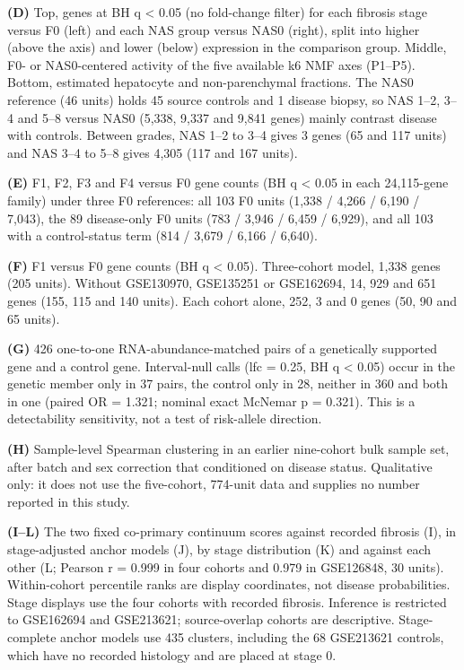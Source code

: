 \textbf{(D)} Top, genes at BH q \textless{} 0.05 (no fold-change filter) for each fibrosis stage versus F0 (left) and each NAS group versus NAS0 (right), split into higher (above the axis) and lower (below) expression in the comparison group. Middle, F0- or NAS0-centered activity of the five available k6 NMF axes (P1--P5). Bottom, estimated hepatocyte and non-parenchymal fractions. The NAS0 reference (46 units) holds 45 source controls and 1 disease biopsy, so NAS 1--2, 3--4 and 5--8 versus NAS0 (5,338, 9,337 and 9,841 genes) mainly contrast disease with controls. Between grades, NAS 1--2 to 3--4 gives 3 genes (65 and 117 units) and NAS 3--4 to 5--8 gives 4,305 (117 and 167 units).

\textbf{(E)} F1, F2, F3 and F4 versus F0 gene counts (BH q \textless{} 0.05 in each 24,115-gene family) under three F0 references: all 103 F0 units (1,338 / 4,266 / 6,190 / 7,043), the 89 disease-only F0 units (783 / 3,946 / 6,459 / 6,929), and all 103 with a control-status term (814 / 3,679 / 6,166 / 6,640).

\textbf{(F)} F1 versus F0 gene counts (BH q \textless{} 0.05). Three-cohort model, 1,338 genes (205 units). Without GSE130970, GSE135251 or GSE162694, 14, 929 and 651 genes (155, 115 and 140 units). Each cohort alone, 252, 3 and 0 genes (50, 90 and 65 units).

\textbf{(G)} 426 one-to-one RNA-abundance-matched pairs of a genetically supported gene and a control gene. Interval-null calls (lfc = 0.25, BH q \textless{} 0.05) occur in the genetic member only in 37 pairs, the control only in 28, neither in 360 and both in one (paired OR = 1.321; nominal exact McNemar p = 0.321). This is a detectability sensitivity, not a test of risk-allele direction.

\textbf{(H)} Sample-level Spearman clustering in an earlier nine-cohort bulk sample set, after batch and sex correction that conditioned on disease status. Qualitative only: it does not use the five-cohort, 774-unit data and supplies no number reported in this study.

\textbf{(I--L)} The two fixed co-primary continuum scores against recorded fibrosis (I), in stage-adjusted anchor models (J), by stage distribution (K) and against each other (L; Pearson r = 0.999 in four cohorts and 0.979 in GSE126848, 30 units). Within-cohort percentile ranks are display coordinates, not disease probabilities. Stage displays use the four cohorts with recorded fibrosis. Inference is restricted to GSE162694 and GSE213621; source-overlap cohorts are descriptive. Stage-complete anchor models use 435 clusters, including the 68 GSE213621 controls, which have no recorded histology and are placed at stage 0.

